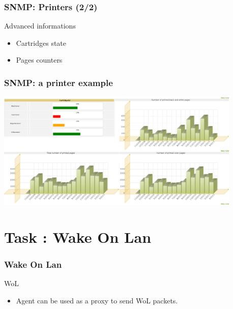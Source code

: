 \documentclass{beamer}
\begin{document}
\begin{frame}
    \frametitle{SNMP: Printers (2/2)}

    \begin{block}{Advanced informations}
    \begin{itemize}
    \item Cartridges state
    \item Pages counters
    \end{itemize}
    \end{block}
\end{frame}

\begin{frame}
    \frametitle{SNMP: a printer example}

    \begin{center}
    \includegraphics[width=11.7cm]{./pics/printer_graph.png}
    \end{center}
\end{frame}

\section{Task : Wake On Lan}

\begin{frame}
    \frametitle{Wake On Lan}

    \begin{block}{WoL}
    \begin{itemize}
        \item Agent can be used as a proxy to send WoL packets.
    \end{itemize}
    \end{block}

\end{frame}
\end{document}
